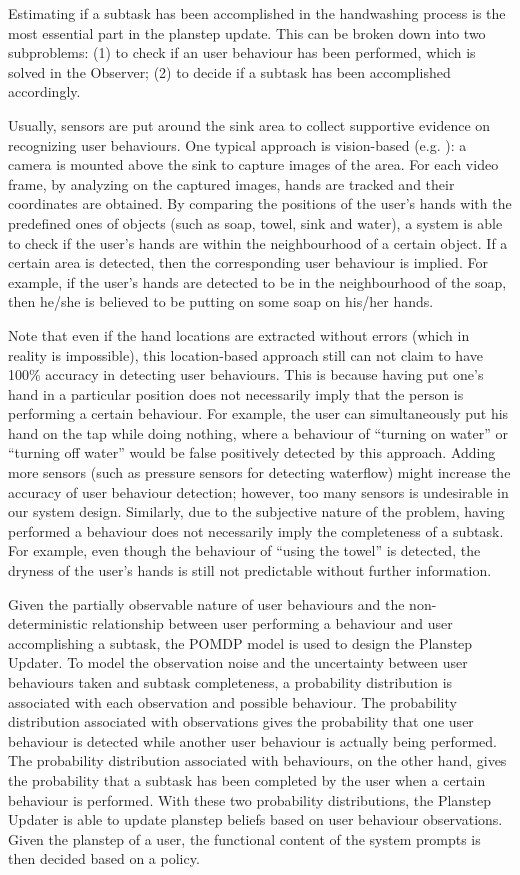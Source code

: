 Estimating if a subtask has been accomplished in the handwashing process is the most essential part in the planstep update. This can be broken down into two subproblems: (1) to check if an user behaviour has been performed, which is solved in the Observer; (2) to decide if a subtask has been accomplished accordingly.

Usually, sensors are put around the sink area to collect supportive evidence on recognizing user behaviours. One typical approach is vision-based (e.g. \cite{hoey2006tracking, mihailidis2004use, czarnuch2014}): a camera is mounted above the sink to capture images of the area. For each video frame, by analyzing on the captured images, hands are tracked and their coordinates are obtained. By comparing the positions of the user's hands with the predefined ones of objects (such as soap, towel, sink and water), a system is able to check if the user's hands are within the neighbourhood of a certain object. If a certain area is detected, then the corresponding user behaviour is implied. For example, if the user's hands are detected to be in the neighbourhood of the soap, then he/she is believed to be putting on some soap on his/her hands. 

Note that even if the hand locations are extracted without errors (which in reality is impossible), this location-based approach still can not claim to have 100\% accuracy in detecting user behaviours. This is because having put one's hand in a particular position does not necessarily imply that the person is performing a certain behaviour. For example, the user can simultaneously put his hand on the tap while doing nothing, where a behaviour of ``turning on water'' or ``turning off water'' would be false positively detected by this approach. Adding more sensors (such as pressure sensors for detecting waterflow) might increase the accuracy of user behaviour detection; however, too many sensors is undesirable in our system design. Similarly, due to the subjective nature of the problem, having performed a behaviour does not necessarily imply the completeness of a subtask. For example, even though the behaviour of ``using the towel'' is detected, the dryness of the user's hands is still not predictable without further information. 

Given the partially observable nature of user behaviours and the non-deterministic relationship between user performing a behaviour and user accomplishing a subtask, the POMDP model is used to design the Planstep Updater. To model the observation noise and the uncertainty between user behaviours taken and subtask completeness, a probability distribution is associated with each observation and possible behaviour. The probability distribution associated with observations gives the probability that one user behaviour is detected while another user behaviour is actually being performed. The probability distribution associated with behaviours, on the other hand, gives the probability that a subtask has been completed by the user when a certain behaviour is performed. With these two probability distributions, the Planstep Updater is able to update planstep beliefs based on user behaviour observations. Given the planstep of a user, the functional content of the system prompts is then decided based on a policy.

